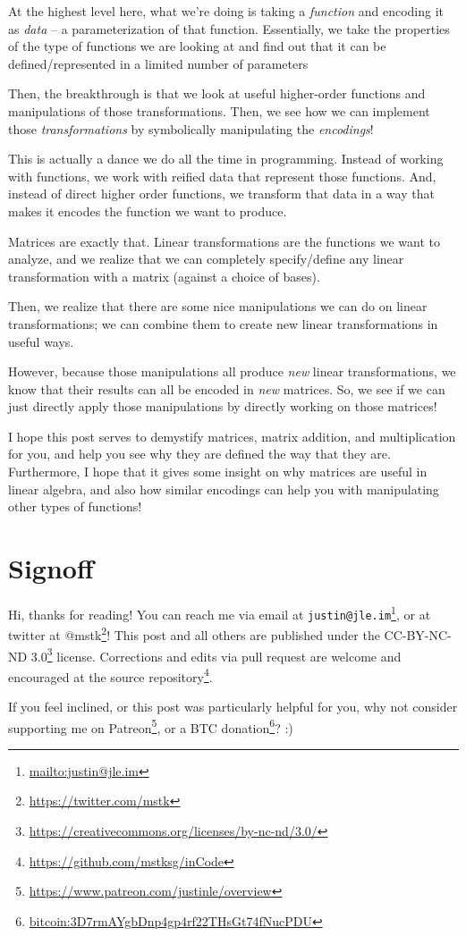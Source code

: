 \documentclass[]{article}
\renewcommand{\href}[2]{#2\footnote{\url{#1}}}
\begin{document}
At the highest level here, what we're doing is taking a \emph{function} and
encoding it as \emph{data} -- a parameterization of that function. Essentially,
we take the properties of the type of functions we are looking at and find out
that it can be defined/represented in a limited number of parameters

Then, the breakthrough is that we look at useful higher-order functions and
manipulations of those transformations. Then, we see how we can implement those
\emph{transformations} by symbolically manipulating the \emph{encodings}!

This is actually a dance we do all the time in programming. Instead of working
with functions, we work with reified data that represent those functions. And,
instead of direct higher order functions, we transform that data in a way that
makes it encodes the function we want to produce.

Matrices are exactly that. Linear transformations are the functions we want to
analyze, and we realize that we can completely specify/define any linear
transformation with a matrix (against a choice of bases).

Then, we realize that there are some nice manipulations we can do on linear
transformations; we can combine them to create new linear transformations in
useful ways.

However, because those manipulations all produce \emph{new} linear
transformations, we know that their results can all be encoded in \emph{new}
matrices. So, we see if we can just directly apply those manipulations by
directly working on those matrices!

I hope this post serves to demystify matrices, matrix addition, and
multiplication for you, and help you see why they are defined the way that they
are. Furthermore, I hope that it gives some insight on why matrices are useful
in linear algebra, and also how similar encodings can help you with manipulating
other types of functions!

\hypertarget{signoff}{%
\section{Signoff}\label{signoff}}

Hi, thanks for reading! You can reach me via email at
\href{mailto:justin@jle.im}{\nolinkurl{justin@jle.im}}, or at twitter at
\href{https://twitter.com/mstk}{@mstk}! This post and all others are published
under the \href{https://creativecommons.org/licenses/by-nc-nd/3.0/}{CC-BY-NC-ND
3.0} license. Corrections and edits via pull request are welcome and encouraged
at \href{https://github.com/mstksg/inCode}{the source repository}.

If you feel inclined, or this post was particularly helpful for you, why not
consider \href{https://www.patreon.com/justinle/overview}{supporting me on
Patreon}, or a \href{bitcoin:3D7rmAYgbDnp4gp4rf22THsGt74fNucPDU}{BTC donation}?
:)
\end{document}
